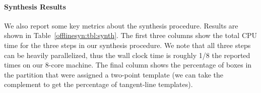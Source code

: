 
\paragraph{Synthesis Results} We also report some key metrics about the
synthesis procedure. Results are shown in Table~\ref{offlinesyn:tbl:synth}. The
first
three columns show the total CPU time for the three steps in our synthesis procedure. We
note that all three steps can be heavily parallelized, thus the wall clock time
is roughly 1/8 the reported times on our 8-core machine. The final column shows
the percentage of boxes in the partition that were assigned a two-point
template (we can take the complement to get the percentage of tangent-line
templates).

